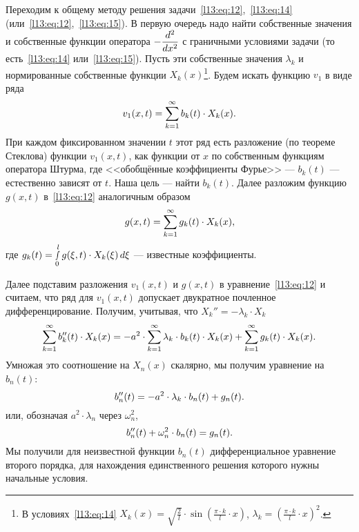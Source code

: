 Переходим к общему методу решения задачи~\eqref{l13:eq:12},~\eqref{l13:eq:14} (или~\eqref{l13:eq:12},~\eqref{l13:eq:15}). В первую очередь надо найти собственные значения и собственные функции оператора $\displaystyle-\frac{d^2}{dx^2}$ с граничными условиями задачи (то есть~\eqref{l13:eq:14} или~\eqref{l13:eq:15}). Пусть эти собственные значения $\lambda_k$ и нормированные собственные функции $X_k(x)$\footnote{В условиях~\eqref{l13:eq:14} $\displaystyle X_k(x)=\sqrt{\frac{2}{l}}\cdot\sin\left(\frac{\pi\cdot k}{l}\cdot x\right)$, $\displaystyle\lambda_k=\left(\frac{\pi\cdot k}{l}\cdot x\right)^2$.}. Будем искать функцию $v_1$ в виде ряда
\begin{equation*}
	\hfill v_1(x,t)=\sum\limits_{k=1}^{\infty}b_k(t)\cdot X_k(x).\hfill
\end{equation*}
При каждом фиксированном значении $t$ этот ряд есть разложение (по теореме Стеклова) функции $v_1(x,t)$, как функции от $x$ по собственным функциям оператора Штурма, где <<обобщённые коэффициенты Фурье>> --- $b_k(t)$ --- естественно зависят от $t$. Наша цель --- найти $b_k(t)$. Далее разложим функцию $g(x,t)$ в~\eqref{l13:eq:12} аналогичным образом
\begin{equation*}
	\hfill g(x,t)=\sum\limits_{k=1}^{\infty}g_k(t)\cdot X_k(x),\hfill
\end{equation*}
где $\displaystyle g_k(t)=\smallint\limits_0^l g(\xi,t)\cdot X_k(\xi)\,d\xi$ --- известные коэффициенты.

Далее подставим разложения $v_1(x,t)$ и $g(x,t)$ в уравнение~\eqref{l13:eq:12} и считаем, что ряд для $v_1(x,t)$ допускает двукратное почленное дифференцирование. Получим, учитывая, что $X_k''=-\lambda_k\cdot X_k$
\begin{equation*}
	\hfill\sum\limits_{k=1}^{\infty}b_k''(t)\cdot X_k(x)=-a^2\cdot\sum\limits_{k=1}^{\infty} \lambda_k\cdot b_k(t)\cdot X_k(x)+\sum\limits_{k=1}^{\infty}g_k(t)\cdot X_k(x).\hfill
\end{equation*}
Умножая это соотношение на $X_n(x)$ скалярно, мы получим уравнение на $b_n(t)$:
\begin{equation*}
	\hfill b_n''(t)=-a^2\cdot\lambda_k\cdot b_n(t)+g_n(t).\hfill
\end{equation*}
или, обозначая $a^2\cdot\lambda_n$ через $\omega_n^2$,
\begin{equation}\label{l13:eq:19}
	\hfill b_n''(t)+\omega_n^2\cdot b_n(t)=g_n(t).\hfill
\end{equation}
Мы получили для неизвестной функции $b_n(t)$ дифференциальное уравнение второго порядка, для нахождения единственного решения которого нужны начальные условия. 

